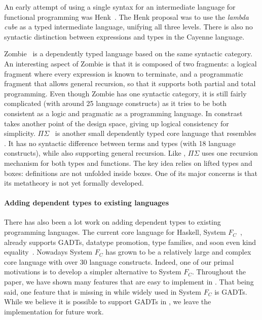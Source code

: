 An early attempt of using a single syntax for an intermediate language
for functional programming was Henk~\cite{pts:henk}. The Henk proposal
was to use the \emph{lambda cube} as a typed intermediate language,
unifying all three levels. There is also no syntactic distinction
between expressions and types in the Cayenne language.

\textsf{Zombie}~\cite{zombie:popl14, zombie:thesis} is a dependently
typed language based on the same syntactic category. An interesting
aspect of Zombie is that it is composed of two fragments: a logical
fragment where every expression is known to terminate, and a
programmatic fragment that allows general recursion, so that it
supports both partial and total programming. Even though Zombie has
one syntactic category, it is still fairly complicated (with around 25
language constructs) as it tries to be both consistent as a logic and
pragmatic as a programming language. In constrast \name takes another
point of the design space, giving up logical consistency for
simplicity. $\Pi\Sigma$~\cite{dep:pisigma} is another small
dependently typed core language that resembles \name. It has no
syntactic difference between terms and types (with 18 language
constructs), while also supporting general recursion. Like \name,
$\Pi\Sigma$ uses one recursion mechanism for both types and
functions. The key idea relies on lifted types and boxes: definitions
are not unfolded inside boxes. One of its major concerns is that its
metatheory is not yet formally developed.


\paragraph{Adding dependent types to existing languages}

There has also been a lot work on adding dependent types to existing
programming languages. The current core language for Haskell, System
$F_{C}$~\cite{Eisenberg:2014}, already supports GADTs, datatype
promotion, type families, and soon even kind
equality~\cite{fc:kind}. Nowadays System $F_{C}$ has grown to be a
relatively large and complex core language with over 30 language
constructs. Indeed, one of our primal motivations is to develop a
simpler alternative to System $F_C$. Throughout the paper, we have
shown many features that are easy to implement in \name. That being
said, one feature that is missing in \name while widely used in System
$F_C$ is GADTs. While we believe it is possible to support GADTs in
\name, we leave the implementation for future work.

